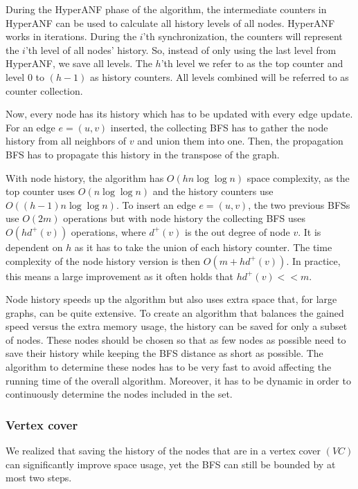 During the HyperANF phase of the algorithm, the intermediate counters in HyperANF can be used to calculate all history levels of all nodes. HyperANF works in iterations. During the $i$'th synchronization, the counters will represent the $i$'th level of all nodes' history. So, instead of only using the last level from HyperANF, we save all levels. The $h$'th level we refer to as the top counter and level $0$ to $(h-1)$ as history counters. All levels combined will be referred to as counter collection.  

Now, every node has its history which has to be updated with every edge update. For an edge $e = (u,v)$ inserted, the collecting BFS has to gather the node history from all neighbors of $v$ and union them into one. Then, the propagation BFS has to propagate this history in the transpose of the graph. 

With node history, the algorithm has $O(hn \log \log n)$ space complexity, as the top counter uses $O(n \log \log n)$ and the history counters use $O((h-1)n \log \log n)$. To insert an edge $e = (u,v)$, the two previous BFSs use $O(2m)$ operations but with node history the collecting BFS uses $O(hd^+(v))$ operations, where $d^+(v)$ is the out degree of node $v$. It is dependent on $h$ as it has to take the union of each history counter. The time complexity of the node history version is then $O(m + hd^+(v))$. In practice, this means a large improvement as it often holds that $hd^+(v) << m$.

Node history speeds up the algorithm but also uses extra space that, for large graphs, can be quite extensive. To create an algorithm that balances the gained speed versus the extra memory usage, the history can be saved for only a subset of nodes. These nodes should be chosen so that as few nodes as possible need to save their history while keeping the BFS distance as short as possible. The algorithm to determine these nodes has to be very fast to avoid affecting the running time of the overall algorithm. Moreover, it has to be dynamic in order to continuously determine the nodes included in the set.

\subsubsection{Vertex cover}
\label{sec:vertex_cover}
We realized that saving the history of the nodes that are in a vertex cover $(VC)$ can significantly improve space usage, yet the BFS can still be bounded by at most two steps.


